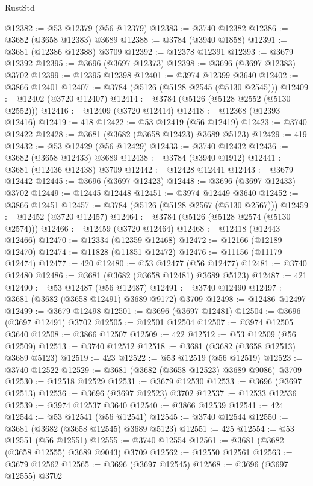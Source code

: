 \begin{lexlean}{RustStd}
\begin{coremodule}
@12382 := @53 @12379 (@56 @12379)
@12383 := @3740 @12382
@12386 := @3682 (@3658 @12383) @3689
@12388 := @3784 (@3940 @1858)
@12391 := @3681 (@12386 @12388) @3709
@12392 := @12378 @12391
@12393 := @3679 @12392
@12395 := @3696 (@3697 @12373)
@12398 := @3696 (@3697 @12383) @3702
@12399 := @12395 @12398
@12401 := @3974 @12399 @3640
@12402 := @3866 @12401
@12407 := @3784 (@5126 (@5128 @2545 (@5130 @2545)))
@12409 := @12402 (@3720 @12407)
@12414 := @3784 (@5126 (@5128 @2552 (@5130 @2552)))
@12416 := @12409 (@3720 @12414)
@12418 := @12368 (@12393 @12416)
@12419 := 418
@12422 := @53 @12419 (@56 @12419)
@12423 := @3740 @12422
@12428 := @3681 (@3682 (@3658 @12423) @3689 @5123)
@12429 := 419
@12432 := @53 @12429 (@56 @12429)
@12433 := @3740 @12432
@12436 := @3682 (@3658 @12433) @3689
@12438 := @3784 (@3940 @1912)
@12441 := @3681 (@12436 @12438) @3709
@12442 := @12428 @12441
@12443 := @3679 @12442
@12445 := @3696 (@3697 @12423)
@12448 := @3696 (@3697 @12433) @3702
@12449 := @12445 @12448
@12451 := @3974 @12449 @3640
@12452 := @3866 @12451
@12457 := @3784 (@5126 (@5128 @2567 (@5130 @2567)))
@12459 := @12452 (@3720 @12457)
@12464 := @3784 (@5126 (@5128 @2574 (@5130 @2574)))
@12466 := @12459 (@3720 @12464)
@12468 := @12418 (@12443 @12466)
@12470 := @12334 (@12359 @12468)
@12472 := @12166 (@12189 @12470)
@12474 := @11828 (@11851 @12472)
@12476 := @11156 (@11179 @12474)
@12477 := 420
@12480 := @53 @12477 (@56 @12477)
@12481 := @3740 @12480
@12486 := @3681 (@3682 (@3658 @12481) @3689 @5123)
@12487 := 421
@12490 := @53 @12487 (@56 @12487)
@12491 := @3740 @12490
@12497 := @3681 (@3682 (@3658 @12491) @3689 @9172) @3709
@12498 := @12486 @12497
@12499 := @3679 @12498
@12501 := @3696 (@3697 @12481)
@12504 := @3696 (@3697 @12491) @3702
@12505 := @12501 @12504
@12507 := @3974 @12505 @3640
@12508 := @3866 @12507
@12509 := 422
@12512 := @53 @12509 (@56 @12509)
@12513 := @3740 @12512
@12518 := @3681 (@3682 (@3658 @12513) @3689 @5123)
@12519 := 423
@12522 := @53 @12519 (@56 @12519)
@12523 := @3740 @12522
@12529 := @3681 (@3682 (@3658 @12523) @3689 @9086) @3709
@12530 := @12518 @12529
@12531 := @3679 @12530
@12533 := @3696 (@3697 @12513)
@12536 := @3696 (@3697 @12523) @3702
@12537 := @12533 @12536
@12539 := @3974 @12537 @3640
@12540 := @3866 @12539
@12541 := 424
@12544 := @53 @12541 (@56 @12541)
@12545 := @3740 @12544
@12550 := @3681 (@3682 (@3658 @12545) @3689 @5123)
@12551 := 425
@12554 := @53 @12551 (@56 @12551)
@12555 := @3740 @12554
@12561 := @3681 (@3682 (@3658 @12555) @3689 @9043) @3709
@12562 := @12550 @12561
@12563 := @3679 @12562
@12565 := @3696 (@3697 @12545)
@12568 := @3696 (@3697 @12555) @3702

\end{coremodule}
\end{lexlean}
